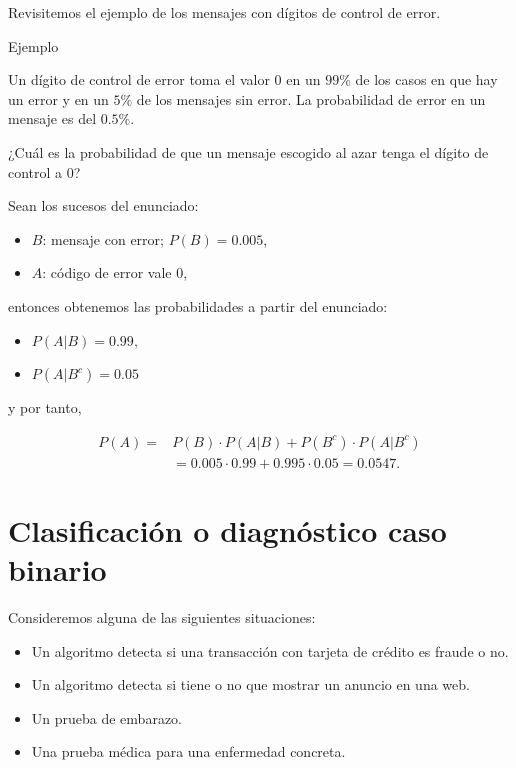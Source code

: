 \documentclass[
  letterpaper,
  DIV=11,
  numbers=noendperiod]{scrreprt}
\providecommand{\tightlist}{%
  \setlength{\itemsep}{0pt}\setlength{\parskip}{0pt}}\usepackage{longtable,booktabs,array}
\begin{document}
Revisitemos el ejemplo de los mensajes con dígitos de control de error.

\begin{Ejemplo}{Ejemplo}{}

Un dígito de control de error toma el valor 0 en un \(99\%\) de los
casos en que hay un error y en un \(5\%\) de los mensajes sin error. La
probabilidad de error en un mensaje es del \(0.5\%\).

¿Cuál es la probabilidad de que un mensaje escogido al azar tenga el
dígito de control a 0?

Sean los sucesos del enunciado:

\begin{itemize}
\tightlist
\item
  \(B\): mensaje con error; \(P(B)=0.005\),
\item
  \(A\): código de error vale 0,
\end{itemize}

entonces obtenemos las probabilidades a partir del enunciado:

\begin{itemize}
\tightlist
\item
  \(P(A|B)=0.99,\)
\item
  \(P(A|B^c)= 0.05\)
\end{itemize}

y por tanto,

\[
\begin{array}{rl}
P(A)=& P(B)\cdot P(A|B)+P(B^c)\cdot P(A|B^c)\\
& =0.005\cdot 0.99+0.995\cdot 0.05=0.0547.
\end{array}
\]

\end{Ejemplo}

\section{Clasificación o diagnóstico caso
binario}\label{clasificaciuxf3n-o-diagnuxf3stico-caso-binario}

Consideremos alguna de las siguientes situaciones:

\begin{itemize}
\tightlist
\item
  Un algoritmo detecta si una transacción con tarjeta de crédito es
  fraude o no.
\item
  Un algoritmo detecta si tiene o no que mostrar un anuncio en una web.
\item
  Un prueba de embarazo.
\item
  Una prueba médica para una enfermedad concreta.
\end{itemize}
\end{document}
